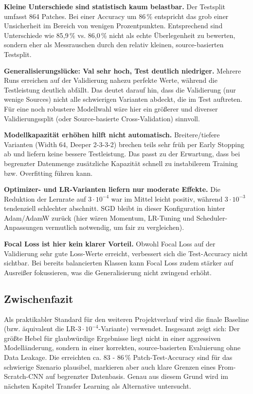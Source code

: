 \begin{listArab}
    \item \textbf{Kleine Unterschiede sind statistisch kaum belastbar.}
Der Testsplit umfasst 864 Patches. Bei einer Accuracy um 86\,\% entspricht das grob einer Unsicherheit im Bereich von wenigen Prozentpunkten. Entsprechend sind Unterschiede wie 85,9\,\% vs. 86,0\,\% nicht als \glqq echte\grqq{} Überlegenheit zu bewerten, sondern eher als Messrauschen durch den relativ kleinen, source-basierten Testsplit.

    \item \textbf{Generalisierungslücke: Val sehr hoch, Test deutlich niedriger.}
Mehrere Runs erreichen auf der Validierung nahezu perfekte Werte, während die Testleistung deutlich abfällt. Das deutet darauf hin, dass die Validierung (nur wenige Sources) nicht alle schwierigen Varianten abdeckt, die im Test auftreten. Für eine noch robustere Modellwahl wäre hier ein größerer und diverser Validierungssplit (oder Source-basierte Cross-Validation) sinnvoll.

    \item \textbf{Modellkapazität erhöhen hilft nicht automatisch.}
Breitere/tiefere Varianten (Width 64, Deeper 2-3-3-2) brechen teils sehr früh per Early Stopping ab und liefern keine bessere Testleistung. Das passt zu der Erwartung, dass bei begrenzter Datenmenge zusätzliche Kapazität schnell zu instabilerem Training bzw. Overfitting führen kann.

    \item \textbf{Optimizer- und LR-Varianten liefern nur moderate Effekte.}
Die Reduktion der Lernrate auf $3\cdot10^{-4}$ war im Mittel leicht positiv, während $3\cdot10^{-3}$ tendenziell schlechter abschnitt. \ac{SGD} bleibt in dieser Konfiguration hinter Adam/AdamW zurück (hier wären Momentum, LR-Tuning und Scheduler-Anpassungen vermutlich notwendig, um fair zu vergleichen).

    \item \textbf{Focal Loss ist hier kein klarer Vorteil.}
Obwohl Focal Loss auf der Validierung sehr gute Loss-Werte erreicht, verbessert sich die Test-Accuracy nicht sichtbar. Bei bereits balancierten Klassen kann Focal Loss zudem stärker auf Ausreißer fokussieren, was die Generalisierung nicht zwingend erhöht.
\end{listArab}

\subsection{Zwischenfazit}
\label{subsec:cnn_fazit}

Als praktikabler Standard für den weiteren Projektverlauf wird die finale Baseline (bzw. äquivalent die LR-$3\cdot10^{-4}$-Variante) verwendet. Insgesamt zeigt sich: Der größte \glqq Hebel\grqq{} für glaubwürdige Ergebnisse liegt nicht in einer aggressiven Modelländerung, sondern in einer korrekten, source-basierten Evaluierung ohne Data Leakage. Die erreichten ca. 83 - 86\,\% Patch-Test-Accuracy sind für das schwierige Szenario plausibel, markieren aber auch klare Grenzen eines From-Scratch-\ac{CNN} auf begrenzter Datenbasis. Genau aus diesem Grund wird im nächsten Kapitel Transfer Learning als Alternative untersucht.
